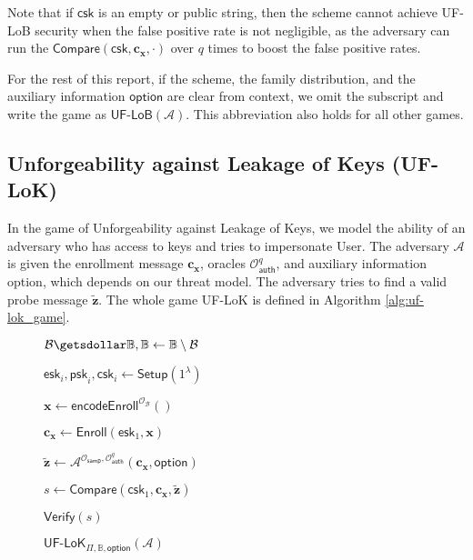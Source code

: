 Note that if $\textsf{csk}$ is an empty or public string, then the scheme cannot achieve UF-LoB security when the false positive rate is not negligible, as the adversary can run the $\textsf{Compare}(\textsf{csk}, \mathbf{c_x}, \cdot)$ over $q$ times to boost the false positive rates.

For the rest of this report, if the scheme, the family distribution, and the auxiliary information $\textsf{option}$ are clear from context, we omit the subscript and write the game as $\textsf{UF-LoB}(\mathcal{A})$. This abbreviation also holds for all other games.




\subsection{Unforgeability against Leakage of Keys (UF-LoK)}
\label{sec:uf-lok_game}

In the game of Unforgeability against Leakage of Keys, we model the ability of an adversary who has access to keys and tries to impersonate \textsf{User}. The adversary $\mathcal{A}$ is given the enrollment message $\mathbf{c_x}$, oracles $\mathcal{O}_\textsf{auth}^q$, and auxiliary information \textsf{option}, which depends on our threat model. The adversary tries to find a valid probe message $\mathbf{\tilde{z}}$. The whole game \textsf{UF-LoK} is defined in Algorithm \ref{alg:uf-lok_game}.

\begin{figure}[h]
\centering

	\begin{minipage}[t]{0.8\linewidth}
	\centering
	\begin{algorithm}[H]
	\caption{$\textsf{UF-LoK}_{\Pi, \mathbb{B}, \textsf{option}}(\mathcal{A})$}
	\label{alg:uf-lok_game}
	\begin{algorithmic}[1]
		\State $\mathcal{B} \getsdollar \mathbb{B}, \mathbb{B} \gets \mathbb{B} \setminus \mathcal{B}$


			\State $\textsf{esk}_i, \textsf{psk}_i, \textsf{csk}_i \gets \textsf{Setup}(1^\lambda)$ 
		
		\EndFor

		\State $\mathbf{x} \gets \textsf{encodeEnroll}^{\mathcal{O}_{\mathcal{B}}}()$

		\State $\mathbf{c_x} \gets \textsf{Enroll}(\textsf{esk}_1, \mathbf{x})$
		
		\State ${\mathbf{\tilde{z}}} \gets \mathcal{A}^{ \mathcal{O}_{\textsf{samp}}, \mathcal{O}_\textsf{auth}^q } ( \mathbf{c_x}, \textsf{option} )$

		\State $s \gets \textsf{Compare}( \textsf{csk}_1, \mathbf{c_x}, \mathbf{\tilde{z}} )$

		\State \Return $\textsf{Verify}(s)$
	\end{algorithmic}
	\end{algorithm}
	\end{minipage}
	
\label{fig:uf-lok_game}
\end{figure}


